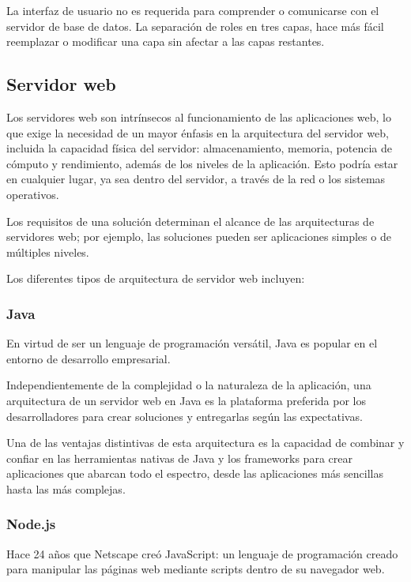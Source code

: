 La interfaz de usuario no es requerida para comprender o comunicarse con el servidor de base de datos. La separación de roles en tres capas, hace más fácil reemplazar o modificar una capa sin afectar a las capas restantes.

\subsection{Servidor web}

Los servidores web son intrínsecos al funcionamiento de las aplicaciones web, lo que exige la necesidad de un mayor énfasis en la arquitectura del servidor web, incluida la capacidad física del servidor: almacenamiento, memoria, potencia de cómputo y rendimiento, además de los niveles de la aplicación. Esto podría estar en cualquier lugar, ya sea dentro del servidor, a través de la red o los sistemas operativos.

Los requisitos de una solución determinan el alcance de las arquitecturas de servidores web; por ejemplo, las soluciones pueden ser aplicaciones simples o de múltiples niveles.

Los diferentes tipos de arquitectura de servidor web incluyen:

\subsubsection{Java}

En virtud de ser un lenguaje de programación versátil, Java es popular en el entorno de desarrollo empresarial.

Independientemente de la complejidad o la naturaleza de la aplicación, una arquitectura de un servidor web en Java es la plataforma preferida por los desarrolladores para crear soluciones y entregarlas según las expectativas.

Una de las ventajas distintivas de esta arquitectura es la capacidad de combinar y confiar en las herramientas nativas de Java y los frameworks para crear aplicaciones que abarcan todo el espectro, desde las aplicaciones más sencillas hasta las más complejas.

\subsubsection{Node.js}

Hace 24 años que Netscape creó JavaScript: un lenguaje de programación creado para manipular las páginas web mediante scripts dentro de su navegador web.

